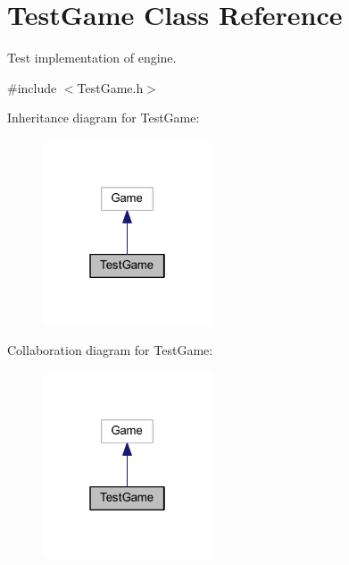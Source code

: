 \hypertarget{class_test_game}{}\section{Test\+Game Class Reference}
\label{class_test_game}


Test implementation of engine.  




{\ttfamily \#include $<$Test\+Game.\+h$>$}



Inheritance diagram for Test\+Game\+:
\nopagebreak
\begin{figure}[H]
\begin{center}
\leavevmode
\includegraphics[width=142pt]{class_test_game__inherit__graph}
\end{center}
\end{figure}


Collaboration diagram for Test\+Game\+:
\nopagebreak
\begin{figure}[H]
\begin{center}
\leavevmode
\includegraphics[width=142pt]{class_test_game__coll__graph}
\end{center}
\end{figure}

